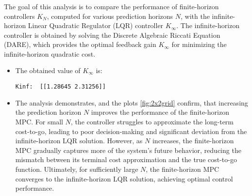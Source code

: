 \documentclass[]{article}
\begin{document}
\begin{flushleft}
	The goal of this analysis is to compare the performance of finite-horizon controllers $K_N$, computed for various prediction horizons 
	$N$, with the infinite-horizon Linear Quadratic Regulator (LQR) controller $K_{\infty}$. The infinite-horizon controller is obtained by solving the 
	Discrete Algebraic Riccati Equation (DARE), which provides the optimal feedback gain $K_{\infty}$ for minimizing the infinite-horizon quadratic cost.
\end{flushleft}
\begin{itemize}
	\item The obtained value of $K_{\infty}$ is:
	\begin{lstlisting}[style=python]
		Kinf:  [[1.28645 2.31256]]
	\end{lstlisting}

	\item 	The analysis demonstrates, and the plots \ref{fig:2x2grid} confirm, that increasing the prediction horizon $N$ improves the performance of the finite-horizon MPC. For small $N$, the controller struggles to approximate the long-term cost-to-go, leading to poor decision-making and significant deviation from the infinite-horizon LQR solution. 
	However, as $N$ increases, the finite-horizon MPC gradually captures more of the system's future behavior, reducing the mismatch between its terminal cost approximation and the true cost-to-go function. 
	Ultimately, for sufficiently large $N$, the finite-horizon MPC converges to the infinite-horizon LQR solution, achieving optimal control performance. 
	

\end{itemize}
\end{document}
